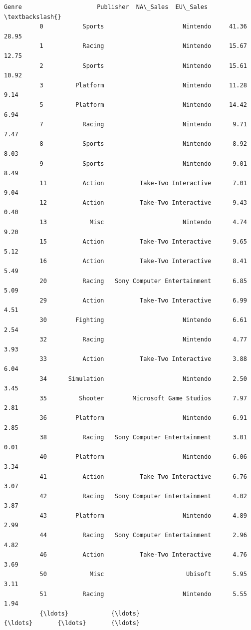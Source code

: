 \documentclass[11pt]{article}
\begin{document}
\begin{Verbatim}[commandchars=\\\{\}]
                       Genre                     Publisher  NA\_Sales  EU\_Sales  \textbackslash{}
          0           Sports                      Nintendo     41.36     28.95   
          1           Racing                      Nintendo     15.67     12.75   
          2           Sports                      Nintendo     15.61     10.92   
          3         Platform                      Nintendo     11.28      9.14   
          5         Platform                      Nintendo     14.42      6.94   
          7           Racing                      Nintendo      9.71      7.47   
          8           Sports                      Nintendo      8.92      8.03   
          9           Sports                      Nintendo      9.01      8.49   
          11          Action          Take-Two Interactive      7.01      9.04   
          12          Action          Take-Two Interactive      9.43      0.40   
          13            Misc                      Nintendo      4.74      9.20   
          15          Action          Take-Two Interactive      9.65      5.12   
          16          Action          Take-Two Interactive      8.41      5.49   
          20          Racing   Sony Computer Entertainment      6.85      5.09   
          29          Action          Take-Two Interactive      6.99      4.51   
          30        Fighting                      Nintendo      6.61      2.54   
          32          Racing                      Nintendo      4.77      3.93   
          33          Action          Take-Two Interactive      3.88      6.04   
          34      Simulation                      Nintendo      2.50      3.45   
          35         Shooter        Microsoft Game Studios      7.97      2.81   
          36        Platform                      Nintendo      6.91      2.85   
          38          Racing   Sony Computer Entertainment      3.01      0.01   
          40        Platform                      Nintendo      6.06      3.34   
          41          Action          Take-Two Interactive      6.76      3.07   
          42          Racing   Sony Computer Entertainment      4.02      3.87   
          43        Platform                      Nintendo      4.89      2.99   
          44          Racing   Sony Computer Entertainment      2.96      4.82   
          46          Action          Take-Two Interactive      4.76      3.69   
          50            Misc                       Ubisoft      5.95      3.11   
          51          Racing                      Nintendo      5.55      1.94   
          {\ldots}            {\ldots}                           {\ldots}       {\ldots}       {\ldots}   

\end{Verbatim}
\end{document}
